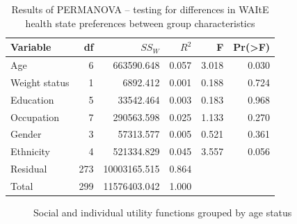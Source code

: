 \documentclass[
  number,
  preprint]{elsarticle}
\begin{document}
\begin{longtable}[]{@{}lrrrrr@{}}

\caption{\label{tbl-permanova}Results of PERMANOVA -- testing for
differences in WAItE health state preferences between group
characteristics}

\tabularnewline

\toprule\noalign{}
Variable & df & \(SS_W\) & \(R^2\) & F & Pr(\textgreater F) \\
\midrule\noalign{}
\endhead
\bottomrule\noalign{}
\endlastfoot
Age & 6 & 663590.648 & 0.057 & 3.018 & 0.030 \\
Weight status & 1 & 6892.412 & 0.001 & 0.188 & 0.724 \\
Education & 5 & 33542.464 & 0.003 & 0.183 & 0.968 \\
Occupation & 7 & 290563.598 & 0.025 & 1.133 & 0.270 \\
Gender & 3 & 57313.577 & 0.005 & 0.521 & 0.361 \\
Ethnicity & 4 & 521334.829 & 0.045 & 3.557 & 0.056 \\
Residual & 273 & 10003165.515 & 0.864 & & \\
Total & 299 & 11576403.042 & 1.000 & & \\

\end{longtable}

\begin{figure}


\caption{\label{fig-age}Social and individual utility functions grouped
by age status}

\end{figure}%
\end{document}
